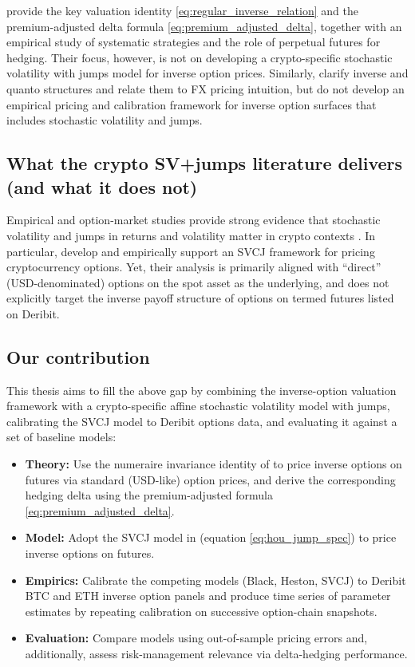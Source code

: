 \documentclass[a4paper,titlepage,12pt]{report}
\theoremstyle{plain}
\begin{document}
\citet{LucicSepp2024} provide the key valuation identity \eqref{eq:regular_inverse_relation} and the
premium-adjusted delta formula \eqref{eq:premium_adjusted_delta}, together with an empirical study of
systematic strategies and the role of perpetual futures for hedging. Their focus, however, is not on
developing a crypto-specific stochastic volatility with jumps model for inverse option prices.
Similarly, \citet{AlexanderChenImeraj2023} clarify inverse and quanto structures and relate them to FX pricing intuition, but do not develop an empirical pricing and calibration framework for inverse option surfaces that includes stochastic volatility and jumps.

\subsection{What the crypto SV+jumps literature delivers (and what it does not)}\label{subsec:gap_svj_lit}

Empirical and option-market studies provide strong evidence that stochastic volatility and jumps in returns and volatility matter in crypto contexts \citep{ScailletTreccaniTrevisan2020,ChenDengNie2024,ChaimLaurini2018,ShenUrquhartWang2020}. In particular, \citet{HouEtAl2020} develop and empirically support an SVCJ framework for pricing cryptocurrency options. Yet, their analysis is primarily aligned with ``direct'' (USD-denominated) options on the spot asset as the underlying, and does not explicitly target the inverse payoff structure of options on termed futures listed on Deribit.

\subsection{Our contribution}\label{subsec:thesis_contribution}

This thesis aims to fill the above gap by combining the inverse-option valuation framework with a crypto-specific affine stochastic volatility model with jumps, calibrating the SVCJ model to Deribit options data, and evaluating it against a set of baseline models:
\begin{itemize}[leftmargin=2em]
\item \textbf{Theory:} Use the numeraire invariance identity of \citet{LucicSepp2024} to price inverse options on futures via standard (USD-like) option prices, and derive the corresponding hedging delta using the
premium-adjusted formula \eqref{eq:premium_adjusted_delta}.
\item \textbf{Model:} Adopt the SVCJ model in \citet{HouEtAl2020}
(equation \eqref{eq:hou_jump_spec}) to price inverse options on futures.
\item \textbf{Empirics:} Calibrate the competing models (Black, Heston, SVCJ) to Deribit BTC and ETH inverse option panels and produce time series of parameter estimates by repeating calibration on successive option-chain
snapshots.
\item \textbf{Evaluation:} Compare models using out-of-sample pricing errors and, additionally, assess risk-management relevance via delta-hedging performance.
\end{itemize}
\end{document}
